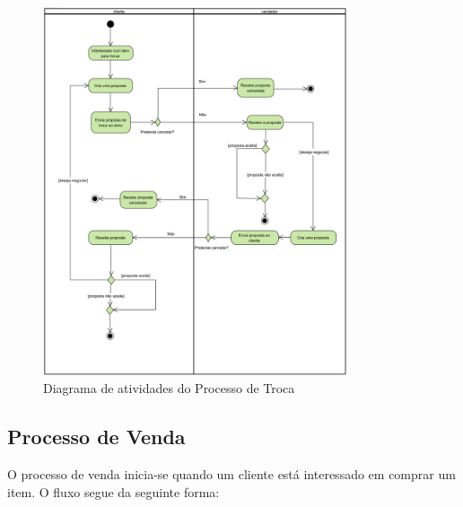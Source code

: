 \documentclass[a4paper, 12pt]{article} %
\begin{document}
\begin{figure}[ht]
	\centering
	\includegraphics[width=0.8\textwidth]{../images/activity-diagram-swaps.png}
	\caption{Diagrama de atividades do Processo de Troca}
	\label{fig:diagrama_atividades_troca}
\end{figure}


\newpage
\clearpage

\subsection{Processo de Venda}
O processo de venda inicia-se quando um cliente está interessado em comprar um item. O fluxo segue da seguinte forma:
\end{document}
